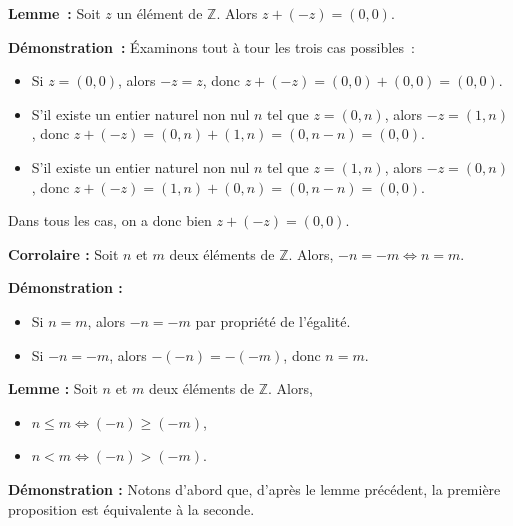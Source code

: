 \done

\medskip

\noindent\textbf{Lemme :} Soit $z$ un élément de $\mathbb{Z}$. 
    Alors $z + (-z) = (0,0)$.

\medskip

\noindent\textbf{Démonstration :} Éxaminons tout à tour les trois cas possibles : 
\begin{itemize}[nosep]
    \item Si $z = (0,0)$, alors $-z = z$, donc $z + (-z) = (0,0) + (0,0) = (0,0)$.
    \item S'il existe un entier naturel non nul $n$ tel que $z = (0,n)$, alors $-z = (1,n)$, donc $z + (-z) = (0,n) + (1,n) = (0,n-n) = (0,0)$.
    \item S'il existe un entier naturel non nul $n$ tel que $z = (1,n)$, alors $-z = (0,n)$, donc $z + (-z) = (1,n) + (0,n) = (0,n-n) = (0,0)$.
\end{itemize}
Dans tous les cas, on a donc bien $z + (-z) = (0,0)$.

\done

\medskip

\noindent\textbf{Corrolaire :} Soit $n$ et $m$ deux éléments de $\mathbb{Z}$. 
    Alors, $-n = -m \Leftrightarrow n = m$.

\medskip

\noindent\textbf{Démonstration :} 
    \begin{itemize}[nosep]
        \item Si $n = m$, alors $-n = -m$ par propriété de l'égalité.
        \item Si $-n = -m$, alors $-(-n) = -(-m)$, donc $n = m$.
    \end{itemize}

    \done

\medskip

\noindent\textbf{Lemme :} Soit $n$ et $m$ deux éléments de $\mathbb{Z}$.
    Alors, 
    \begin{itemize}[nosep]
        \item $n \leq m \Leftrightarrow (-n) \geq (-m)$,
        \item $n < m \Leftrightarrow (-n) > (-m)$. 
    \end{itemize}

\medskip

\noindent\textbf{Démonstration :} 
    Notons d'abord que, d'après le lemme précédent, la première proposition est équivalente à la seconde. 

